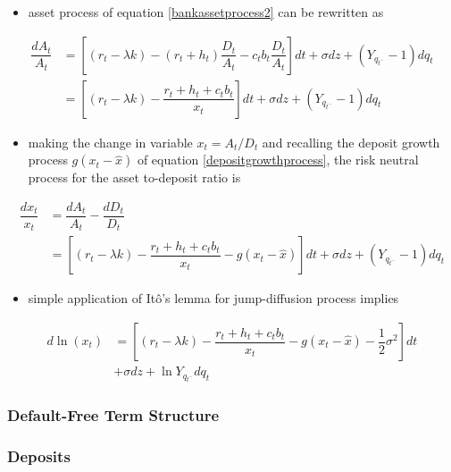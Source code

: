 \begin{itemize}
\item asset process of equation \ref{bankassetprocess2} can be rewritten as
\end{itemize}
\begin{align} 
\dfrac{dA_t}{A_t} &= \left[ \left( r_t - \lambda k \right) - \left( r_t + h_t \right) \dfrac{D_t}{A_t} - c_t b_t \dfrac{D_t}{A_t}\right] dt + \sigma dz + \left( Y_{q_{t^{-}}} - 1\right) dq_t\\ \nonumber
&= \left[ \left( r_t - \lambda k \right) - \dfrac{r_t + h_t+c_t b_t}{x_t}\right] dt + \sigma dz + \left( Y_{q_{t^{-}}} - 1\right) dq_t
\end{align}

\begin{itemize}
\item making the change in variable $x_t = A_t/D_t$ and recalling the deposit growth process $g\left(x_t - \hat{x}\right)$ of equation \ref{depositgrowthprocess}, the risk neutral process for the asset to-deposit ratio is
\end{itemize}
\begin{align}
\dfrac{dx_t}{x_t}&= \dfrac{dA_t}{A_t} - \dfrac{dD_t}{D_t}\\ \nonumber
&= \left[ \left(r_t - \lambda k \right) - \dfrac{r_t + h_t + c_t b_t}{x_t} - g\left(x_t - \hat{x}\right)\right] dt + \sigma dz + \left( Y_{q_{t^{-}}} - 1 \right) dq_t
\end{align}

\begin{itemize}
\item simple application of It\^{o}'s lemma for jump-diffusion process implies
\end{itemize}
\begin{align}
d \ln\left(x_t\right) &= \left[ \left( r_t - \lambda k \right) - \dfrac{r_t + h_t + c_t b_t}{x_t} - g\left( x_t - \hat{x} \right) - \dfrac{1}{2} \sigma^2 \right] dt \\ \nonumber
&+ \sigma dz + \ln Y_{q_{t^{-}}} dq_t
\end{align}

\subsubsection{Default-Free Term Structure}

\subsubsection{Deposits}

